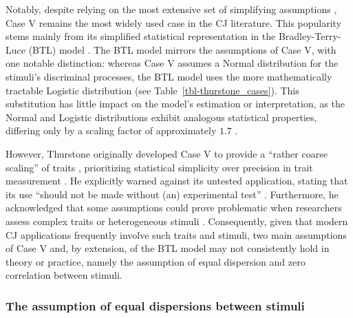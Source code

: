 \documentclass[
  authoryear,
  review,
  1p]{elsarticle}
\begin{document}
Notably, despite relying on the most extensive set of simplifying
assumptions
\citetext{\citealp[pp.~253]{Bramley_2008}; \citealp[pp.~677]{Kelly_et_al_2022}},
Case V remains the most widely used case in the CJ literature. This
popularity stems mainly from its simplified statistical representation
in the Bradley-Terry-Luce (BTL) model
\citep{Bradley_et_al_1952, Luce_1959}. The BTL model mirrors the
assumptions of Case V, with one notable distinction: whereas Case V
assumes a Normal distribution for the stimuli's discriminal processes,
the BTL model uses the more mathematically tractable Logistic
distribution \citep[pp.~254]{Andrich_1978, Bramley_2008} (see
Table~\ref{tbl-thurstone_cases}). This substitution has little impact on
the model's estimation or interpretation, as the Normal and Logistic
distributions exhibit analogous statistical properties, differing only
by a scaling factor of approximately \(1.7\)
\citep[pp.~16]{vanderLinden_et_al_2017_I}.

However, Thurstone originally developed Case V to provide a ``rather
coarse scaling'' of traits \citep[pp.~269]{Thurstone_1927b},
prioritizing statistical simplicity over precision in trait measurement
\citep[pp.~677]{Kelly_et_al_2022}. He explicitly warned against its
untested application, stating that its use ``should not be made without
(an) experimental test'' \citep[pp.~270]{Thurstone_1927b}. Furthermore,
he acknowledged that some assumptions could prove problematic when
researchers assess complex traits or heterogeneous stimuli
\citep[pp.~376]{Thurstone_1927a}. Consequently, given that modern CJ
applications frequently involve such traits and stimuli, two main
assumptions of Case V and, by extension, of the BTL model may not
consistently hold in theory or practice, namely the assumption of equal
dispersion and zero correlation between stimuli.

\subsubsection{The assumption of equal dispersions between
stimuli}\label{sec-theory-issue1a}
\end{document}

